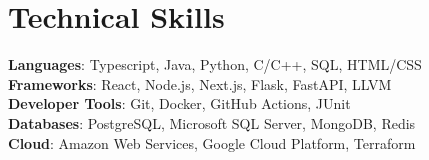 \documentclass[a4paper,11pt]{article}
\begin{document}
\section{Technical Skills}
\begin{itemize}[leftmargin=0.15in, label={}]
  \small{\item{
        \textbf{Languages}{: Typescript, Java, Python, C/C++, SQL, HTML/CSS} \\
        \textbf{Frameworks}{: React, Node.js, Next.js, Flask, FastAPI, LLVM} \\
        \textbf{Developer Tools}{: Git, Docker, GitHub Actions, JUnit}\\
        \textbf{Databases}{: PostgreSQL, Microsoft SQL Server, MongoDB, Redis}\\
        \textbf{Cloud}{: Amazon Web Services, Google Cloud Platform, Terraform}
        }}
\end{itemize}
\end{document}
